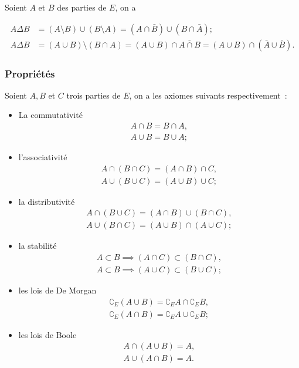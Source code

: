\begin{prop}
  Soient \(A\) et \(B\) des parties de \(E\), on a

  \begin{align}
    A \Delta B &= (A\setminus B) \cup (B \setminus A) = (A \cap \bar{B}) \cup (B
    \cap \bar{A}); \\
    A \Delta B &= (A \cup B) \setminus (B \cap A) = (A \cup B) \cap \bar{A \cap B}  = (A \cup B) \cap (\bar{A} \cup \bar{B}).
  \end{align}
\end{prop}

\subsubsection{Propriétés}\label{chap3-subsubsec:prop}

\begin{axiome}
  Soient \(A, B\) et \(C\) trois parties de \(E\), on a les axiomes suivants
  respectivement~:
  \begin{itemize}
    \item La commutativité
      \begin{gather}
        A \cap B= B \cap A, \\
        A \cup B = B \cup A;
      \end{gather}
    \item l'associativité
      \begin{gather}
        A \cap (B \cap C) = (A \cap B) \cap C, \\
        A \cup (B \cup C) = (A \cup B) \cup C;
      \end{gather}
    \item la distributivité
      \begin{gather}
        A \cap (B \cup C) = (A \cap B) \cup (B \cap C), \\
        A \cup (B \cap C) = (A \cup B) \cap (A \cup C);
      \end{gather}
    \item la stabilité
      \begin{gather}
        A \subset{}B \implies (A \cap C) \subset{}(B \cap C), \\
        A \subset{}B \implies (A \cup C) \subset{}(B \cup C);
      \end{gather}
    \item les lois de De Morgan
      \begin{gather}
        \complement_E (A \cup B) = \complement_E A \cap \complement_E B, \\
        \complement_E (A \cap B) = \complement_E A \cup \complement_E B;
      \end{gather}
    \item les lois de Boole
      \begin{gather}
        A \cap (A \cup B) = A, \\
        A \cup (A \cap B) = A.
      \end{gather}
  \end{itemize}
\end{axiome}

